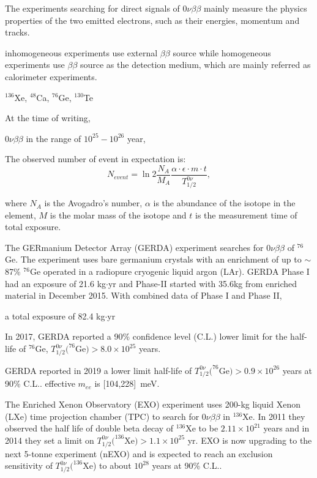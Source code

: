 The experiments searching for direct signals of $0\nu\beta\beta$ mainly measure the physics properties of the two emitted electrons, such as their energies, momentum and tracks. 

inhomogeneous experiments use external $\beta\beta$ source
while homogeneous experiments use $\beta\beta$ source as the detection medium, which are mainly referred as calorimeter experiments\cite{cremonesi2014challenges,shimizu2019double}.




$^{136}$Xe, $^{48}$Ca, $^{76}$Ge, $^{130}$Te

At the time of writing, 

$0\nu\beta\beta$ in the range of $10^{25}-10^{26}$ year,



The observed number of event in expectation is: 
\[
N_{event} = \ln 2 \frac{N_A}{M_A}\frac{\alpha\cdot\epsilon\cdot m\cdot t}{T^{0\nu}_{1/2}},
\]

where $N_A$ is the Avogadro's number, $\alpha$ is the abundance of the isotope in the element, 
$M$ is the molar mass of the isotope
and $t$ is the measurement time of total exposure.



The GERmanium Detector Array (GERDA) experiment searches for $0\nu\beta\beta$ of $^{76}$Ge. The experiment uses bare germanium crystals with an enrichment of up to $\sim$87\% $^{76}$Ge operated in a radiopure cryogenic liquid argon (LAr)\cite{agostini2016search}. GERDA Phase I had an exposure of 21.6 kg$\cdot$yr and Phase-II started with 35.6kg from enriched material in December 2015. With combined data of Phase I and Phase II, 

a total exposure of 82.4 kg$\cdot$yr 

In 2017, GERDA reported a 90\% confidence level (C.L.) lower limit for the half-life of $^{76}$Ge, $T^{0\nu}_{1/2}(^{76}$Ge$)>8.0\times 10^{25}$ years.

GERDA reported in 2019 a lower limit half-life of $T^{0\nu}_{1/2}(^{76}$Ge$)>0.9\times 10^{26}$ years at 90\% C.L.\cite{agostini2019probing}. effective $m_{ee}$ is [104,228]~meV.


The Enriched Xenon Observatory (EXO) experiment uses 200-kg liquid Xenon (LXe) time projection chamber (TPC) to search for $0\nu\beta\beta$ in $^{136}$Xe. In 2011 they observed the half life of double beta decay of $^{136}$Xe to be $2.11\times 10^{21}$ years and in 2014 they set a limit on $T^{0\nu}_{1/2}(^{136}$Xe$)>1.1\times 10^{25}$ yr\cite{exo}. EXO is now upgrading to the next 5-tonne experiment (nEXO) and is expected to reach an exclusion sensitivity of $T^{0\nu}_{1/2}(^{136}$Xe) to about $10^{28}$ years at 90\% C.L.\cite{albert2018sensitivity}.

